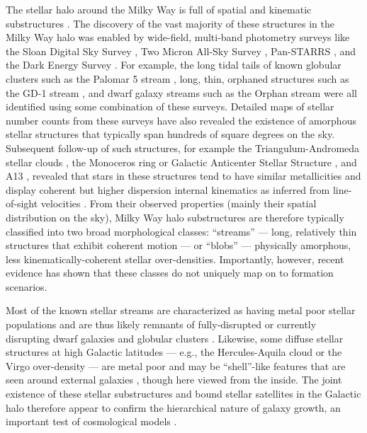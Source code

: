 \documentclass[twocolumn]{aastex62}
\begin{document}
The stellar halo around the Milky Way is full of spatial and kinematic
substructures \citep[e.g.,][]{TODO}.
The discovery of the vast majority of these structures in the Milky Way halo was
enabled by wide-field, multi-band photometry surveys like the Sloan Digital Sky
Survey \cite[SDSS;][]{TODO}, Two Micron All-Sky Survey \citep[2MASS;][]{TODO},
Pan-STARRS \citep[PS1;][]{TODO}, and the Dark Energy Survey
\citep[DES;][]{TODO}.
For example, the long tidal tails of known globular clusters such as the Palomar
5 stream \citep{TODO}, long, thin, orphaned structures such as the GD-1 stream
\citep{Grillmair:2006}, and dwarf galaxy streams such as
the Orphan stream \citep{TODO} were all identified using some combination
of these surveys.
Detailed maps of stellar number counts from these surveys have also revealed the
existence of amorphous stellar structures that typically span hundreds of square
degrees on the sky.
Subsequent follow-up of such structures, for example the Triangulum-Andromeda
stellar clouds \citep[TriAnd;][]{TODO}, the Monoceros ring or Galactic
Anticenter Stellar Structure \citep[Mon/GASS;][]{TODO}, and A13 \citep{TODO},
revealed that stars in these structures tend to have similar metallicities and
display coherent but higher dispersion internal kinematics as inferred from
line-of-sight velocities \citep[e.g.,][]{Sheffield:TODO, Li:TODO}.
From their observed properties (mainly their spatial distribution on the sky),
Milky Way halo substructures are therefore typically classified into two broad
morphological classes: ``streams'' --- long, relatively thin structures that
exhibit coherent motion --- or ``blobs'' --- physically amorphous, less
kinematically-coherent stellar over-densities.
Importantly, however, recent evidence has shown that these classes do not
uniquely map on to formation scenarios.

Most of the known stellar streams are characterized as having metal poor stellar
populations and are thus likely remnants of fully-disrupted or currently
disrupting dwarf galaxies and globular clusters \citep{TODO}.
Likewise, some diffuse stellar structures at high Galactic latitudes --- e.g.,
the Hercules-Aquila cloud \citep{TODO} or the Virgo over-density \citep{TODO}
--- are metal poor and may be ``shell''-like features that are seen around
external galaxies \citep[e.g.,][]{Kado-Fong:TODO}, though here viewed from the
inside.
The joint existence of these stellar substructures and bound stellar satellites
in the Galactic halo therefore appear to confirm the hierarchical nature of
galaxy growth, an important test of cosmological models \citep{Bullock:TODO,
TODO}.
\end{document}
